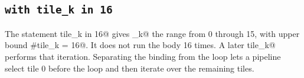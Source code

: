 \subsection*{\texttt{with tile\_\allowbreak{}k in 16}}

The statement \co@with tile_k in 16@ gives \co@tile_k@ the range from 0 through 15, with upper bound \co@#tile_k = 16@. It does not run the body 16 times. A later \co@foreach tile_k@ performs that iteration. Separating the binding from the loop lets a pipeline select tile 0 before the loop and then iterate over the remaining tiles.
